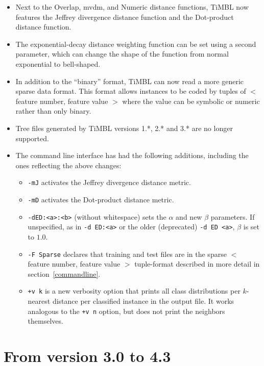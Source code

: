 \documentclass{book}
\begin{document}
\begin{itemize}

\item Next to the Overlap, {\sc mvdm}, and Numeric distance functions,
  TiMBL now features the Jeffrey divergence distance function and the
  Dot-product distance function.

\item The exponential-decay distance weighting function can be set
  using a second parameter, which can change the shape of the function
  from normal exponential to bell-shaped.

\item In addition to the ``binary'' format, TiMBL can now read
  a more generic sparse data format. This format allows instances to
  be coded by tuples of $<$ feature number, feature value $>$ where the
  value can be symbolic or numeric rather than only binary.

\item Tree files generated by TiMBL versions 1.*, 2.* and 3.* are no
longer supported.

\item The command line interface has had the following additions,
  including the ones reflecting the above changes:

\begin{itemize}
\item {\tt -mJ} activates the Jeffrey divergence distance metric.
\item {\tt -mD} activates the Dot-product distance metric.
\item {\tt -dED:<a>:<b>} (without whitespace) sets the $\alpha$ and new
  $\beta$ parameters. If unspecified, as in {\tt -d ED:<a>} or the older
  (deprecated) {\tt -d ED <a>}, $\beta$ is set to $1.0$.
\item {\tt -F Sparse} declares that training and test files are in the
  sparse $<$ feature number, feature value $>$ tuple-format described in
  more detail in section~\ref{commandline}.
\item {\tt +v k} is a new verbosity option that prints all class
distributions per $k$-nearest distance per classified instance in the
output file. It works analogous to the {\tt +v n} option, but does not
print the neighbors themselves.
\end{itemize}

\end{itemize}

\section{From version 3.0 to 4.3}
\end{document}
